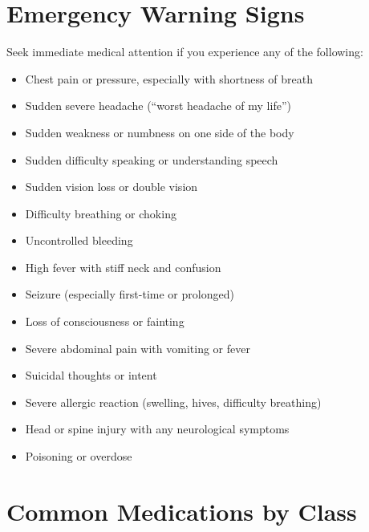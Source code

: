 \section*{Emergency Warning Signs}
\label{sec:quickref_emergency}

Seek immediate medical attention if you experience any of the following:

\begin{itemize}[noitemsep]
  \item Chest pain or pressure, especially with shortness of breath
  \item Sudden severe headache (``worst headache of my life'')
  \item Sudden weakness or numbness on one side of the body
  \item Sudden difficulty speaking or understanding speech
  \item Sudden vision loss or double vision
  \item Difficulty breathing or choking
  \item Uncontrolled bleeding
  \item High fever with stiff neck and confusion
  \item Seizure (especially first-time or prolonged)
  \item Loss of consciousness or fainting
  \item Severe abdominal pain with vomiting or fever
  \item Suicidal thoughts or intent
  \item Severe allergic reaction (swelling, hives, difficulty breathing)
  \item Head or spine injury with any neurological symptoms
  \item Poisoning or overdose
\end{itemize}

\section*{Common Medications by Class}
\label{sec:quickref_drugs}

